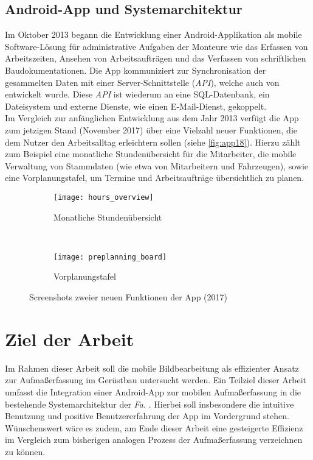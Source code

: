 \subsection{Android-App und Systemarchitektur}
Im Oktober 2013 begann die Entwicklung einer Android-Applikation als mobile Software-Lösung für administrative Aufgaben der Monteure wie das Erfassen von Arbeitszeiten, Ansehen von Arbeitsaufträgen und das Verfassen von schriftlichen Baudokumentationen.
Die App kommuniziert zur Synchronisation der gesammelten Daten mit einer Server-Schnittstelle (\emph{API}), welche auch von \vr{} entwickelt wurde.
Diese \emph{API} ist wiederum an eine SQL-Datenbank, ein Dateisystem und externe Dienste, wie einen E-Mail-Dienst, gekoppelt. \\

Im Vergleich zur anfänglichen Entwicklung aus dem Jahr 2013 verfügt die App zum jetzigen Stand (November 2017) über eine Vielzahl neuer Funktionen, die dem Nutzer den Arbeitsalltag erleichtern sollen (siehe \autoref{fig:app18}).
Hierzu zählt zum Beispiel eine monatliche Stundenübersicht für die Mitarbeiter, die mobile Verwaltung von Stammdaten (wie etwa von Mitarbeitern und Fahrzeugen), sowie eine Vorplanungstafel, um Termine und Arbeitsaufträge übersichtlich zu planen. 
\begin{figure}[h]
  \begin{subfigure}[t]{0.4\textwidth}
    \centering
    \texttt{[image: hours\_overview]}
    \caption{Monatliche Stundenübersicht}
  \end{subfigure}
  ~
  \begin{subfigure}[t]{0.4\textwidth}
    \centering
    \texttt{[image: preplanning\_board]}
    \caption{Vorplanungstafel}
  \end{subfigure}
  \centering
  \caption{Screenshots zweier neuen Funktionen der App (2017)}
  \label{fig:app18}
\end{figure}

\section{Ziel der Arbeit}
Im Rahmen dieser Arbeit soll die mobile Bildbearbeitung als effizienter Ansatz zur Aufmaßerfassung im Gerüstbau untersucht werden.
Ein Teilziel dieser Arbeit umfasst die Integration einer Android-App zur mobilen Aufmaßerfassung in die bestehende Systemarchitektur der \emph{Fa.} \vr{}.
Hierbei soll insbesondere die intuitive Benutzung und positive Benutzererfahrung der App im Vordergrund stehen.
Wünschenswert wäre es zudem, am Ende dieser Arbeit eine gesteigerte Effizienz im Vergleich zum bisherigen analogen Prozess der Aufmaßerfassung verzeichnen zu können.

